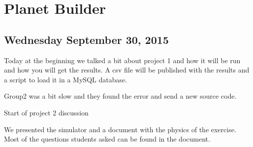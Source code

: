 \section{Planet Builder}
\subsection{Wednesday September 30, 2015 }
Today at the beginning we talked a bit about project 1 and how it will be run and how you will get the results. A csv file will be published with the results and a script to load it in a MySQL database.

Group2 was a bit slow and they found the error and send a new source code.

Start of project 2 discussion

We presented the simulator and a document with the physics of the exercise. Most of the questions students asked can be found in the document.

